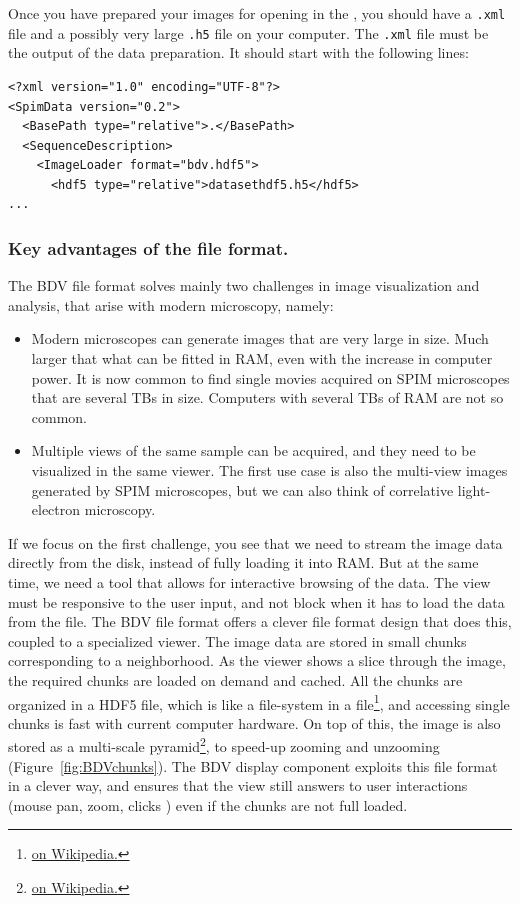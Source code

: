 Once you have prepared your images for opening in the \bdv, you should have a \texttt{.xml} file and a possibly very large \texttt{.h5} file on your computer. The \texttt{.xml} file must be the output of the \bdv data preparation. It should start with the following lines:
\begin{verbatim}
<?xml version="1.0" encoding="UTF-8"?>
<SpimData version="0.2">
  <BasePath type="relative">.</BasePath>
  <SequenceDescription>
    <ImageLoader format="bdv.hdf5">
      <hdf5 type="relative">datasethdf5.h5</hdf5>
...
\end{verbatim}


\subsubsection{Key advantages of the \Bdv file format.}
\label{BDV_advantages}

The BDV file format solves mainly two challenges in image visualization and analysis, that arise with modern microscopy, namely:
\begin{itemize}
    
    \item Modern microscopes can generate images that are very large in size. Much larger that what can be fitted in RAM, even with the increase in computer power. It is now common to find single movies acquired on SPIM microscopes that are several TBs in size. Computers with several TBs of RAM are not so common.
    
    \item Multiple views of the same sample can be acquired, and they need to be visualized in the same viewer. The first use case is also the multi-view images generated by SPIM microscopes, but we can also think of correlative light-electron microscopy.
    
\end{itemize}

If we focus on the first challenge, you see that we need to stream the image data directly from the disk, instead of fully loading it into RAM. 
But at the same time, we need a tool that allows for interactive browsing of the data. 
The view must be responsive to the user input, and not block when it has to load the data from the file. 
The BDV file format offers a clever file format design that does this, coupled to a specialized viewer.
The image data are stored in small chunks corresponding to a neighborhood. As the viewer shows a slice through the image, the required chunks are loaded on demand and cached.
All the chunks are organized in a HDF5 file, which is like a file-system in a file\footnote{\href{https://en.wikipedia.org/wiki/Hierarchical_Data_Format}{ on Wikipedia.}}, and accessing single chunks is fast with current computer hardware.
On top of this, the image is also stored as a multi-scale pyramid\footnote{\href{https://en.wikipedia.org/wiki/Pyramid_(image_processing)}{ on Wikipedia.}}, to speed-up zooming and unzooming (Figure~\ref{fig:BDVchunks}).
The BDV display component exploits this file format in a clever way, and ensures that the view still answers to user interactions (mouse pan, zoom, clicks \etc) even if the chunks are not full loaded.

